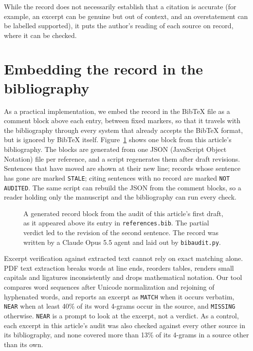 \documentclass[11pt]{article}
\begin{document}
While the record does not necessarily establish that a citation is accurate (for example, an excerpt can be genuine but out of context, and an overstatement can be labelled supported), it puts the author's reading of each source on record, where it can be checked.

\section{Embedding the record in the bibliography}

As a practical implementation, we embed the record in the BibTeX file as a comment block above each entry, between fixed markers, so that it travels with the bibliography through every system that already accepts the BibTeX format, but is ignored by BibTeX itself. Figure~\ref{fig:example} shows one block from this article's bibliography. The blocks are generated from one JSON (JavaScript Object Notation) file per reference, and a script regenerates them after draft revisions. Sentences that have moved are shown at their new line; records whose sentence has gone are marked \texttt{STALE}; citing sentences with no record are marked \texttt{NOT AUDITED}. The same script can rebuild the JSON from the comment blocks, so a reader holding only the manuscript and the bibliography can run every check.

\begin{figure}[t]
\centering
{}
\caption{A generated record block from the audit of this article's first draft, as it appeared above its entry in \texttt{references.bib}. The partial verdict led to the revision of the second sentence. The record was written by a Claude Opus 5.5 agent and laid out by \texttt{bibaudit.py}.}
\label{fig:example}
\end{figure}

Excerpt verification against extracted text cannot rely on exact matching alone. PDF text extraction breaks words at line ends, reorders tables, renders small capitals and ligatures inconsistently and drops mathematical notation. Our tool compares word sequences after Unicode normalization and rejoining of hyphenated words, and reports an excerpt as \texttt{MATCH} when it occurs verbatim, \texttt{NEAR} when at least 40\% of its word 4-grams occur in the source, and \texttt{MISSING} otherwise. \texttt{NEAR} is a prompt to look at the excerpt, not a verdict. As a control, each excerpt in this article's audit was also checked against every other source in its bibliography, and none covered more than 13\% of its 4-grams in a source other than its own.
\end{document}
